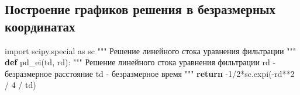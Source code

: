 \documentclass[
  russian,
  letterpaper,
  DIV=11,
  numbers=noendperiod,
  oneside]{scrartcl}
\newenvironment{Shaded}{\begin{snugshade}}{\end{snugshade}}
\newcommand{\CommentTok}[1]{\textcolor[rgb]{0.37,0.37,0.37}{#1}}
\newcommand{\ControlFlowTok}[1]{\textcolor[rgb]{0.00,0.23,0.31}{\textbf{#1}}}
\newcommand{\DecValTok}[1]{\textcolor[rgb]{0.68,0.00,0.00}{#1}}
\newcommand{\ImportTok}[1]{\textcolor[rgb]{0.00,0.46,0.62}{#1}}
\newcommand{\KeywordTok}[1]{\textcolor[rgb]{0.00,0.23,0.31}{\textbf{#1}}}
\newcommand{\NormalTok}[1]{\textcolor[rgb]{0.00,0.23,0.31}{#1}}
\newcommand{\OperatorTok}[1]{\textcolor[rgb]{0.37,0.37,0.37}{#1}}
\begin{document}
\subsection{Построение графиков решения в безразмерных
координатах}\label{ux43fux43eux441ux442ux440ux43eux435ux43dux438ux435-ux433ux440ux430ux444ux438ux43aux43eux432-ux440ux435ux448ux435ux43dux438ux44f-ux432-ux431ux435ux437ux440ux430ux437ux43cux435ux440ux43dux44bux445-ux43aux43eux43eux440ux434ux438ux43dux430ux442ux430ux445}

\begin{Shaded}
\begin{Highlighting}[]
\ImportTok{import}\NormalTok{ scipy.special }\ImportTok{as}\NormalTok{ sc}
\CommentTok{"""}
\CommentTok{Решение линейного стока уравнения фильтрации}
\CommentTok{"""}
\KeywordTok{def}\NormalTok{ pd\_ei(td, rd):}
    \CommentTok{"""}
\CommentTok{    Решение линейного стока уравнения фильтрации}
\CommentTok{    rd {-} безразмерное расстояние}
\CommentTok{    td {-} безразмерное время}
\CommentTok{    """}
    \ControlFlowTok{return} \OperatorTok{{-}}\DecValTok{1}\OperatorTok{/}\DecValTok{2}\OperatorTok{*}\NormalTok{sc.expi(}\OperatorTok{{-}}\NormalTok{rd}\OperatorTok{**}\DecValTok{2} \OperatorTok{/} \DecValTok{4} \OperatorTok{/}\NormalTok{ td)}
\end{Highlighting}
\end{Shaded}
\end{document}
